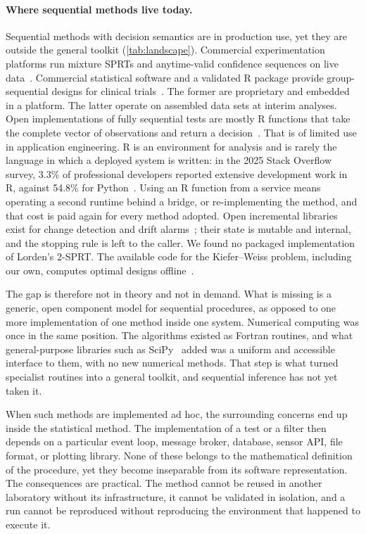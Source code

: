 \documentclass[11pt,a4paper]{article}
\theoremstyle{definition}
\theoremstyle{remark}
\begin{document}
\paragraph{Where sequential methods live today.}
Sequential methods with decision semantics are in production use, yet
they are outside the general toolkit (\cref{tab:landscape}). Commercial
experimentation platforms run mixture SPRTs and anytime-valid confidence
sequences on live data~\cite{johari2017,johari2022,zhao2019,lindon2022}.
Commercial statistical software and a validated R package provide
group-sequential designs for clinical
trials~\cite{sas,rpact,wassmer2025}. The former are proprietary and
embedded in a platform. The latter operate on assembled data sets at
interim analyses. Open implementations of fully sequential tests are
mostly R functions that take the complete vector of observations and
return a decision~\cite{schnuerch2020,pramanik2021,grunwald2024}. That
is of limited use in application engineering. R is an environment for
analysis and is rarely the language in which a deployed system is
written: in the 2025 Stack Overflow survey, 3.3\% of professional
developers reported extensive development work in R, against 54.8\% for
Python~\cite{stackoverflow2025}. Using an R function from a service
means operating a second runtime behind a bridge, or re-implementing the
method, and that cost is paid again for every method adopted. Open
incremental libraries exist for change detection and drift
alarms~\cite{romano2026,montiel2021}; their state is mutable and
internal, and the stopping rule is left to the caller. We found no
packaged implementation of Lorden's 2-SPRT. The available code for the
Kiefer--Weiss problem, including our own, computes optimal designs
offline~\cite{novikov2022a,novikov2022b,novikov2023}.

The gap is therefore not in theory and not in demand. What is missing is
a generic, open component model for sequential procedures, as opposed to
one more implementation of one method inside one system. Numerical
computing was once in the same position. The algorithms existed as
Fortran routines, and what general-purpose libraries such as
SciPy~\cite{virtanen2020} added was a uniform and accessible interface
to them, with no new numerical methods. That step is what turned
specialist routines into a general toolkit, and sequential inference has
not yet taken it.

When such methods are implemented ad hoc, the surrounding concerns end up
inside the statistical method.
The implementation of a test or a filter then depends on a particular
event loop, message broker, database, sensor API, file format, or
plotting library. None of these belongs to the mathematical definition of
the procedure, yet they become inseparable from its software
representation. The consequences are practical. The method cannot be
reused in another laboratory without its infrastructure, it cannot be
validated in isolation, and a run cannot be reproduced without
reproducing the environment that happened to execute it.
\end{document}

